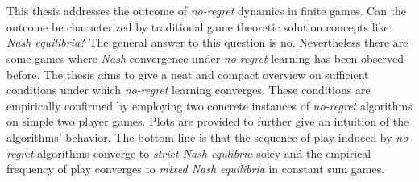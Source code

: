 \chapter{\abstractname}

This thesis addresses the outcome of \textit{no-regret} dynamics in finite games. Can the outcome be characterized by traditional game theoretic solution concepts like \textit{Nash equilibria}? The general answer to this question is no. Nevertheless there are some games where \textit{Nash} convergence under \textit{no-regret} learning has been observed before. The thesis aims to give a neat and compact overview on sufficient conditions under which \textit{no-regret} learning converges. These conditions are empirically confirmed by employing two concrete instances of \textit{no-regret} algorithms on simple two player games. Plots are provided to further give an intuition of the algorithms' behavior. The bottom line is that the sequence of play induced by \textit{no-regret} algorithms converge to \textit{strict Nash equlibria} soley and the empirical frequency of play converges to \textit{mixed Nash equilibria} in constant sum games.
